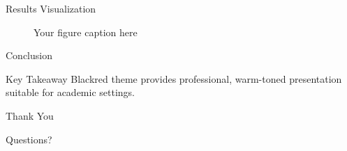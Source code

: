 \documentclass[10pt]{beamer}
\begin{document}
\begin{frame}{Results Visualization}
  \begin{figure}
    \centering
    \caption{Your figure caption here}
  \end{figure}
\end{frame}

\begin{frame}{Conclusion}
  \begin{block}{Key Takeaway}
    Blackred theme provides professional, warm-toned presentation suitable for academic settings.
  \end{block}
\end{frame}

\begin{frame}
  \begin{center}
    \Large Thank You
    
    \vspace{1cm}
    
    \normalsize Questions?
  \end{center}
\end{frame}
\end{document}
